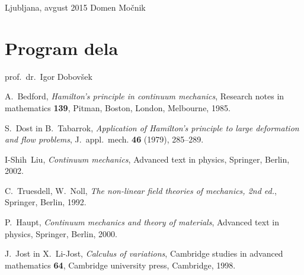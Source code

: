\documentclass[12pt,a4paper]{report}
\begin{document}
\null

\noindent Ljubljana, avgust 2015 \hfill Domen Močnik
\pagebreak



\tableofcontents
\pagebreak



\chapter*{Program dela}


\null

\noindent prof.~dr.~Igor Dobovšek
\pagebreak




\pagebreak













\begin{thebibliography}{99}

A.~Bedford, \emph{Hamilton's principle in continuum mechanics}, Research notes in mathematics {\bf 139},
Pitman, Boston, London, Melbourne, 1985.

S.~Dost in B.~Tabarrok, \emph{Application of Hamilton's principle to large deformation and flow problems},
J.~appl.~mech. {\bf 46} (1979), 285--289.

I-Shih~Liu, \emph{Continuum mechanics}, Advanced text in physics,
Springer, Berlin, 2002.

C.~Truesdell, W.~Noll, \emph{The non-linear field theories of mechanics, 2nd ed.},
Springer, Berlin, 1992.

P.~Haupt, \emph{Continuum mechanics and theory of materials}, Advanced text in physics,
Springer, Berlin, 2000.

J.~Jost in X.~Li-Jost, \emph{Calculus of variations}, Cambridge studies in advanced mathematics {\bf 64},
Cambridge university press, Cambridge, 1998.

\end{thebibliography}
\end{document}
